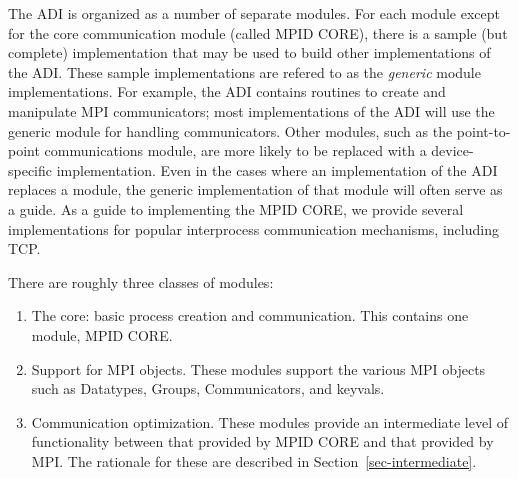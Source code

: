 \documentclass[dvipdfm]{article}
\begin{document}
The ADI is organized as a number of separate modules.
For each module except for the core communication module (called MPID
CORE), there is a sample (but complete) implementation that may be used to
build other implementations of the ADI.  These sample
implementations are refered to as the \emph{generic} module
implementations. For example,
the ADI contains routines to create and manipulate MPI communicators;
most implementations of the ADI will use the generic module for
handling communicators.  Other modules, such as the point-to-point
communications module, are more likely to be replaced with a
device-specific implementation.  Even in the cases where an
implementation of the ADI replaces a module, the generic
implementation of that module will often serve as a guide.
As a guide to implementing the MPID CORE, we provide several implementations
for popular interprocess communication mechanisms, including TCP.

There are roughly three classes of modules:
\begin{enumerate}
\item The core: basic process creation and communication. This
contains one module, MPID CORE. 
\item Support for MPI objects.  These modules support the various MPI
objects such as Datatypes, Groups, Communicators, and keyvals.
\item Communication optimization.  These modules provide an
intermediate level of functionality between that provided by MPID CORE
and that provided by MPI.  The rationale for these are described in
Section~\ref{sec-intermediate}. 
\end{enumerate}
\end{document}
